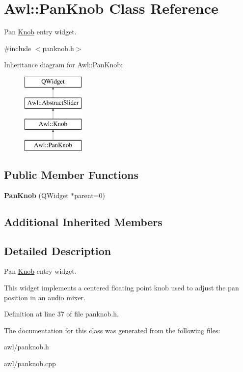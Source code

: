 \hypertarget{class_awl_1_1_pan_knob}{}\section{Awl\+:\+:Pan\+Knob Class Reference}
\label{class_awl_1_1_pan_knob}


Pan \hyperlink{class_awl_1_1_knob}{Knob} entry widget.  




{\ttfamily \#include $<$panknob.\+h$>$}

Inheritance diagram for Awl\+:\+:Pan\+Knob\+:\begin{figure}[H]
\begin{center}
\leavevmode
\includegraphics[height=4.000000cm]{class_awl_1_1_pan_knob}
\end{center}
\end{figure}
\subsection*{Public Member Functions}
\begin{DoxyCompactItemize}
\item 
\mbox{\label{class_awl_1_1_pan_knob_a892adf526c7d3f46b3c8d7aff13f0367}} 
{\bfseries Pan\+Knob} (Q\+Widget $\ast$parent=0)
\end{DoxyCompactItemize}
\subsection*{Additional Inherited Members}


\subsection{Detailed Description}
Pan \hyperlink{class_awl_1_1_knob}{Knob} entry widget. 

This widget implements a centered floating point knob used to adjust the pan position in an audio mixer. 

Definition at line 37 of file panknob.\+h.



The documentation for this class was generated from the following files\+:\begin{DoxyCompactItemize}
\item 
awl/panknob.\+h\item 
awl/panknob.\+cpp\end{DoxyCompactItemize}
